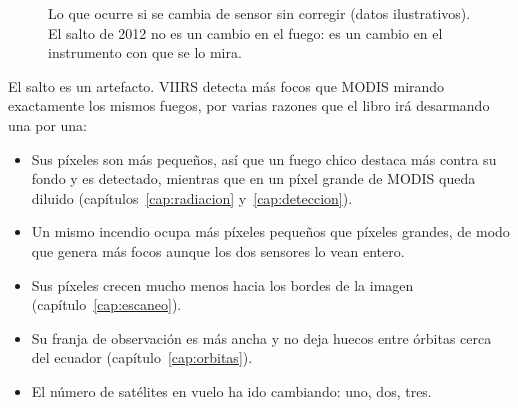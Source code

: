 \begin{figure}[ht]
\centering
{}
\caption{Lo que ocurre si se cambia de sensor sin corregir (datos ilustrativos). El salto de
2012 no es un cambio en el fuego: es un cambio en el instrumento con que se lo mira.}
\label{fig:salto}
\end{figure}

El salto es un artefacto. VIIRS detecta más focos que MODIS mirando exactamente los mismos
fuegos, por varias razones que el libro irá desarmando una por una:

\begin{itemize}
  \item Sus píxeles son más pequeños, así que un fuego chico destaca más contra su fondo y es
  detectado, mientras que en un píxel grande de MODIS queda diluido
  (capítulos~\ref{cap:radiacion} y~\ref{cap:deteccion}).
  \item Un mismo incendio ocupa más píxeles pequeños que píxeles grandes, de modo que genera
  más focos aunque los dos sensores lo vean entero.
  \item Sus píxeles crecen mucho menos hacia los bordes de la imagen
  (capítulo~\ref{cap:escaneo}).
  \item Su franja de observación es más ancha y no deja huecos entre órbitas cerca del ecuador
  (capítulo~\ref{cap:orbitas}).
  \item El número de satélites en vuelo ha ido cambiando: uno, dos, tres.
\end{itemize}

